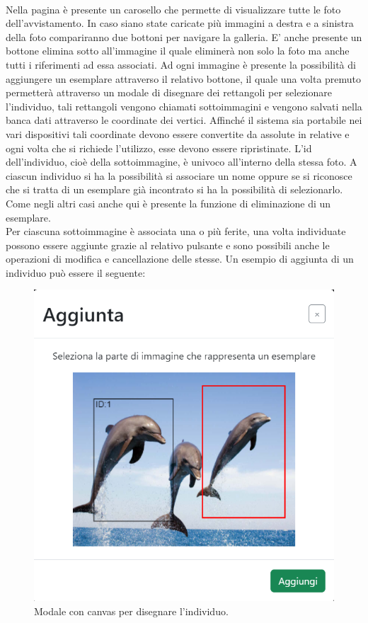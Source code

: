 \documentclass[a4paper,final,12pt]{report}
\begin{document}
\\Nella pagina è presente un carosello che permette di visualizzare tutte le foto dell'avvistamento. In caso siano state caricate più immagini a destra e a sinistra della foto compariranno due bottoni per navigare la galleria. E' anche presente un bottone elimina sotto all'immagine il quale eliminerà non solo la foto ma anche tutti i riferimenti ad essa associati.
Ad ogni immagine è presente la possibilità di aggiungere un esemplare attraverso il relativo bottone, il quale una volta premuto permetterà attraverso un modale di disegnare dei rettangoli per selezionare l'individuo, tali rettangoli vengono chiamati sottoimmagini e vengono salvati nella banca dati attraverso le coordinate dei vertici. Affinché il sistema sia portabile nei vari dispositivi tali coordinate devono essere convertite da assolute in relative e ogni volta che si richiede l'utilizzo, esse devono essere ripristinate. L'id dell'individuo, cioè della sottoimmagine, è univoco all'interno della stessa foto. A ciascun individuo si ha la possibilità si associare un nome oppure se si riconosce che si tratta di un esemplare già incontrato si ha la possibilità di selezionarlo. Come negli altri casi anche qui è presente la funzione di eliminazione di un esemplare.\\
Per ciascuna sottoimmagine è associata una o più ferite, una volta individuate possono essere aggiunte grazie al relativo pulsante e sono possibili anche le operazioni di modifica e cancellazione delle stesse.
Un esempio di aggiunta di un individuo può essere il seguente:
\begin{figure}[hbtp]
\centering
\includegraphics[scale=0.80]{img_concettuale/addEsempl.png}
\caption{Modale con canvas per disegnare l'individuo.}
\end{figure}
\end{document}
